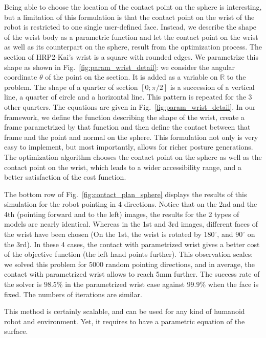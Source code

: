 Being able to choose the location of the contact point on the sphere is interesting, but a limitation of this formulation is that the contact point on the wrist of the robot is restricted to one single user-defined face.
Instead, we describe the shape of the wrist body as a parametric function and let the contact point on the wrist as well as its counterpart on the sphere, result from the optimization process.
The section of HRP2-Kai's wrist is a square with rounded edges.
We parametrize this shape as shown in Fig.~\ref{fig:param_wrist_detail}:
we consider the angular coordinate $\theta$ of the point on the section.
It is added as a variable on $\mathbb{R}$ to the problem.
The shape of a quarter of section $[0;\pi/2]$ is a succession of a vertical line, a quarter of circle and a horizontal line.
This pattern is repeated for the 3 other quarters.
The equations are given in Fig.~\ref{fig:param_wrist_detail}.
In our framework, we define the function describing the shape of the wrist, create a frame parametrized by that function and then define the contact between that frame and the point and normal on the sphere.
This formulation not only is very easy to implement, but most importantly, allows for richer posture generations.
The optimization algorithm chooses the contact point on the sphere as well as the contact point on the wrist, which leads to a wider accessibility range, and a better satisfaction of the cost function.

The bottom row of Fig.~\ref{fig:contact_plan_sphere} displays the results of this simulation for the robot pointing in 4 directions.
Notice that on the 2nd and the 4th (pointing forward and to the left) images, the results for the 2 types of models are nearly identical.
Whereas in the 1st and 3rd images, different faces of the wrist have been chosen (On the 1st, the wrist is rotated by $180^{\circ}$, and $90^{\circ}$ on the 3rd).
In these 4 cases, the contact with parametrized wrist gives a better cost of the objective function (the left hand points further).
This observation scales:
we solved this problem for 5000 random pointing directions, and in average, the contact with parametrized wrist allows to reach 5mm further.
The success rate of the solver is $98.5\%$ in the parametrized wrist case against $99.9\%$ when the face is fixed.
The numbers of iterations are similar.

This method is certainly scalable, and can be used for any kind of humanoid robot and environment.
Yet, it requires to have a parametric equation of the surface.

